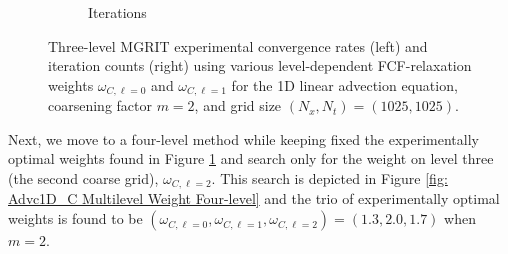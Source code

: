 \documentclass[VANCOUVER,STIX1COL]{WileyNJD-v2}
\begin{document}
\begin{figure}[h!]
\begin{subfigure}[b]{0.38\textwidth}
    \caption{\normalsize Iterations}
    \end{subfigure}
    \caption{Three-level MGRIT experimental convergence rates (left) and iteration counts (right) using various level-dependent FCF-relaxation weights $\omega_{C,\ell=0}$ and $\omega_{C,\ell=1}$ for the 1D linear advection equation, coarsening factor $m=2$, and grid size $(N_x, N_t) = (1025, 1025)$.} 
    \label{fig: AdvcC Multilevel Weight Three-level}
\end{figure}

Next, we move to a four-level method while keeping fixed the experimentally optimal weights found in 
Figure \ref{fig: AdvcC Multilevel Weight Three-level} and search only for the weight on level three
(the second coarse grid), $\omega_{C,\ell=2}$.  This search is depicted in Figure 
\ref{fig: Advc1D_C Multilevel Weight Four-level} and the trio of experimentally optimal
weights is found to be $(\omega_{C,\ell=0}, \omega_{C,\ell=1}, \omega_{C,\ell=2})=(1.3, 2.0, 1.7)$ when $m=2$.
\end{document}
